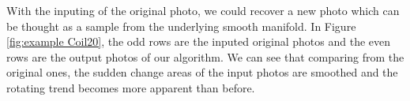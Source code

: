 \documentclass{article}
\theoremstyle{remark}
\begin{document}
With the inputing of the original photo, we could recover a new photo which can be thought as a sample from the underlying smooth manifold. In Figure \ref{fig:example Coil20}, the odd rows are the inputed original photos and the even rows are the output photos of our algorithm. We can see that comparing from the original ones, the sudden change areas of the input photos are smoothed and the rotating trend becomes more apparent than before.


\nocite{langley00}





%
%
%
\end{document}
